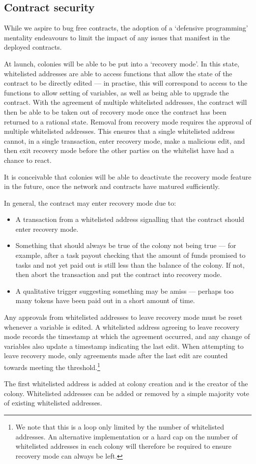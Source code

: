 \subsection{Contract security}\label{sec:escape-hatches}
While we aspire to bug free contracts, the adoption of a `defensive programming' mentality endeavours to limit the impact of any issues that manifest in the deployed contracts.

At launch, colonies will be able to be put into a `recovery mode'. In this state, whitelisted addresses are able to access functions that allow the state of the contract to be directly edited --- in practise, this will correspond to access to the functions to allow setting of variables, as well as being able to upgrade the contract. With the agreement of multiple whitelisted addresses, the contract will then be able to be taken out of recovery mode once the contract has been returned to a rational state. Removal from recovery mode requires the approval of multiple whitelisted addresses. This ensures that a single whitelisted address cannot, in a single transaction, enter recovery mode, make a malicious edit, and then exit recovery mode before the other parties on the whitelist have had a chance to react.

It is conceivable that colonies will be able to deactivate the recovery mode feature in the future, once the network and contracts have matured sufficiently.

In general, the contract may enter recovery mode due to:
\begin{itemize}
 \item A transaction from a whitelisted address signalling that the contract should enter recovery mode.
 \item Something that should always be true of the colony not being true --- for example, after a task payout checking that the amount of funds promised to tasks and not yet paid out is still less than the balance of the colony. If not, then abort the transaction and put the contract into recovery mode.
 \item A qualitative trigger suggesting something may be amiss --- perhaps too many tokens have been paid out in a short amount of time.
\end{itemize}

Any approvals from whitelisted addresses to leave recovery mode must be reset whenever a variable is edited. A whitelisted address agreeing to leave recovery mode records the timestamp at which the agreement occurred, and any change of variables also update a timestamp indicating the last edit. When attempting to leave recovery mode, only agreements made after the last edit are counted towards meeting the threshold.\footnote{We note that this is a loop only limited by the number of whitelisted addresses. An alternative implementation or a hard cap on the number of whitelisted addresses in each colony will therefore be required to ensure recovery mode can always be left.}

The first whitelisted address is added at colony creation and is the creator of the colony. Whitelisted addresses can be added or removed by a simple majority vote of existing whitelisted addresses.